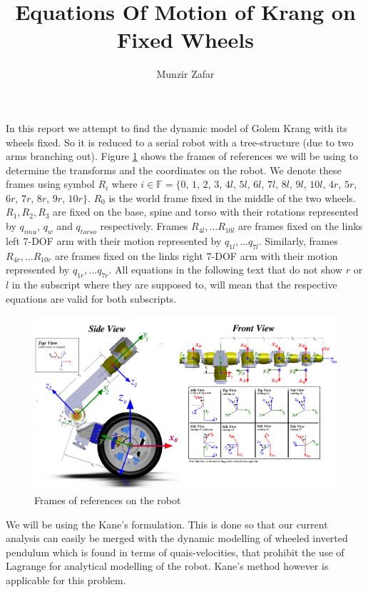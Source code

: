 \documentclass[a4paper,10pt]{article}
\title{Equations Of Motion of Krang on Fixed Wheels}
\author{Munzir Zafar}
\begin{document}
\maketitle

In this report we attempt to find the dynamic model of Golem Krang with its wheels fixed. So it
is reduced to a serial robot with a tree-structure (due to two arms branching out). Figure \ref{fig:frames}
shows the frames of references we will be using to determine the transforms and the coordinates on the robot.
We denote these frames using symbol $R_i$ where $i \in \mathbb{F} = \lbrace 0$, $1$, $2$, $3$, $4l$, $5l$, $6l$, $7l$,
$8l$, $9l$, $10l$, $4r$, $5r$, $6r$, $7r$, $8r$, $9r$, $10r \rbrace$. $R_0$ is the world frame fixed in the middle of
the two wheels. $R_1, R_2, R_3$ are fixed on the base, spine and torso with their rotations represented
by $q_{imu}$, $q_w$ and $q_{torso}$ respectively. Frames $R_{4l}, ... R_{10l}$ are frames fixed on the links left 7-DOF
arm with their motion represented by $q_{1l}, ... q_{7l}$. Similarly, frames $R_{4r}, ... R_{10r}$ are frames 
fixed on the links right 7-DOF arm with their motion represented by $q_{1r}, ... q_{7r}$. All equations in the 
following text that do not show $r$ or $l$ in the subscript where they are supposed to, will mean that the 
respective equations are valid for both subscripts.

\begin{figure}
 \centering
 \includegraphics[width=1.0\textwidth]{Figures/framesLHRule.png}
 \caption{Frames of references on the robot}
 \label{fig:frames}
\end{figure}

We will be using the Kane's formulation. This is done so that our current analysis can easily be merged with
the dynamic modelling of wheeled inverted pendulum which is found in terms of quais-velocities, that prohibit
the use of Lagrange for analytical modelling of the robot. Kane's method however is applicable for this
problem.
\end{document}
